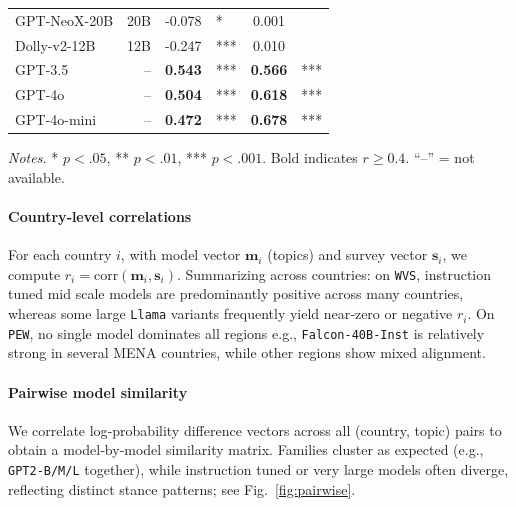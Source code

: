 \documentclass[runningheads]{llncs}
\newcommand{\figref}[1]{Fig.~\ref{#1}}
\begin{document}
\begin{table}
\begin{tabular}{@{} l r S[table-format=+1.3] l S[table-format=+1.3] l @{}}
    GPT-NeoX-20B       & 20B  & -0.078  & *   &  0.001  &     \\
    Dolly-v2-12B       & 12B  & -0.247  & *** &  0.010  &     \\
    \midrule
    GPT-3.5            & --   & \bfseries 0.543 & *** & \bfseries 0.566 & *** \\
    GPT-4o             & --   & \bfseries 0.504 & *** & \bfseries 0.618 & *** \\
    GPT-4o-mini        & --   & \bfseries 0.472 & *** & \bfseries 0.678 & *** \\
    \bottomrule
  \end{tabular}
  \vspace{0.25\baselineskip}
  \parbox{0.60\textwidth}{\footnotesize\emph{Notes.} * $p{<}.05$, ** $p{<}.01$, *** $p{<}.001$.
  Bold indicates $r \ge 0.4$. “--” = not available.}
  \vspace{-0.6em}
\end{table}

\paragraph{Country‑level correlations}
For each country $i$, with model vector $\mathbf{m}_i$ (topics) and survey vector $\mathbf{s}_i$, we compute $r_i=\mathrm{corr}(\mathbf{m}_i,\mathbf{s}_i)$. Summarizing across countries: on \texttt{WVS}, instruction tuned mid scale models are predominantly positive across many countries, whereas some large \texttt{Llama} variants frequently yield near‑zero or negative $r_i$. On \texttt{PEW}, no single model dominates all regions e.g., \texttt{Falcon‑40B‑Inst} is relatively strong in several MENA countries, while other regions show mixed alignment.


\paragraph{Pairwise model similarity}
We correlate log‑probability difference vectors across all (country, topic) pairs to obtain a model‑by‑model similarity matrix. Families cluster as expected (e.g., \texttt{GPT2‑B/M/L} together), while instruction tuned or very large models often diverge, reflecting distinct stance patterns; see \figref{fig:pairwise}.
\end{document}
